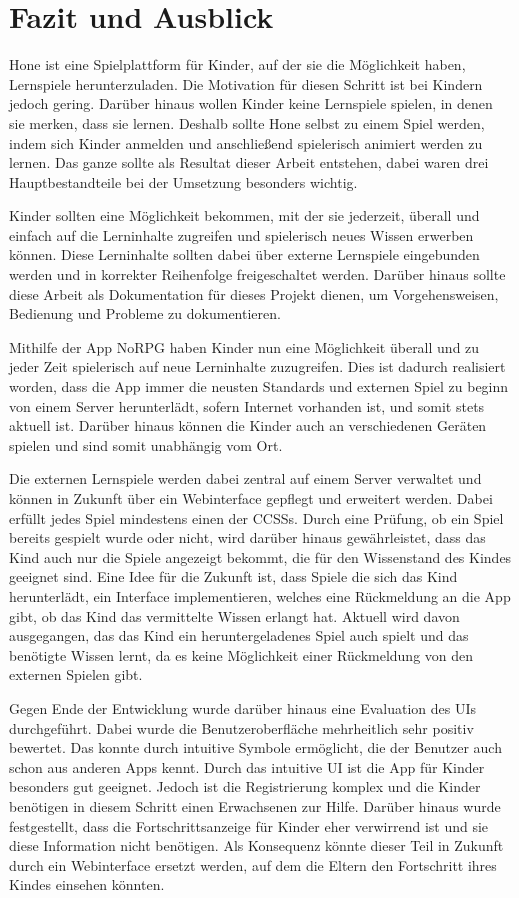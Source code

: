 \chapter{Fazit und Ausblick}

Hone ist eine Spielplattform für Kinder, auf der sie die Möglichkeit haben, Lernspiele herunterzuladen. Die Motivation für diesen Schritt ist bei Kindern jedoch gering. Darüber hinaus wollen Kinder keine Lernspiele spielen, in denen sie merken, dass sie lernen. Deshalb sollte Hone selbst zu einem Spiel werden, indem sich Kinder anmelden und anschließend spielerisch animiert werden zu lernen. Das ganze sollte als Resultat dieser Arbeit entstehen, dabei waren drei Hauptbestandteile bei der Umsetzung besonders wichtig. 

Kinder sollten eine Möglichkeit bekommen, mit der sie jederzeit, überall und einfach auf die Lerninhalte zugreifen und spielerisch neues Wissen erwerben können. Diese Lerninhalte sollten dabei über externe Lernspiele eingebunden werden und in korrekter Reihenfolge freigeschaltet werden. Darüber hinaus sollte diese Arbeit als Dokumentation für dieses Projekt dienen, um Vorgehensweisen, Bedienung und Probleme zu dokumentieren. 

Mithilfe der App NoRPG haben Kinder nun eine Möglichkeit überall und zu jeder Zeit spielerisch auf neue Lerninhalte zuzugreifen. Dies ist dadurch realisiert worden, dass die App immer die neusten Standards und externen Spiel zu beginn von einem Server herunterlädt, sofern Internet vorhanden ist, und somit stets aktuell ist. Darüber hinaus können die Kinder auch an verschiedenen Geräten spielen und sind somit unabhängig vom Ort. 

Die externen Lernspiele werden dabei zentral auf einem Server verwaltet und können in Zukunft über ein Webinterface gepflegt und erweitert werden. Dabei erfüllt jedes Spiel mindestens einen der \acp{CCSS}. Durch eine Prüfung, ob ein Spiel bereits gespielt wurde oder nicht, wird darüber hinaus gewährleistet, dass das Kind auch nur die Spiele angezeigt bekommt, die für den Wissenstand des Kindes geeignet sind. Eine Idee für die Zukunft ist, dass Spiele die sich das Kind herunterlädt, ein Interface implementieren, welches eine Rückmeldung an die App gibt, ob das Kind das vermittelte Wissen erlangt hat. Aktuell wird davon ausgegangen, das das Kind ein heruntergeladenes Spiel auch spielt und das benötigte Wissen lernt, da es keine Möglichkeit einer Rückmeldung von den externen Spielen gibt.

Gegen Ende der Entwicklung wurde darüber hinaus eine Evaluation des \aclp{UI} durchgeführt. Dabei wurde die Benutzeroberfläche mehrheitlich sehr positiv bewertet. Das konnte durch intuitive Symbole ermöglicht, die der Benutzer auch schon aus anderen Apps kennt. Durch das intuitive \ac{UI} ist die App für Kinder besonders gut geeignet. Jedoch ist die Registrierung komplex und die Kinder benötigen in diesem Schritt einen Erwachsenen zur Hilfe. Darüber hinaus wurde festgestellt, dass die Fortschrittsanzeige für Kinder eher verwirrend ist und sie diese Information nicht benötigen. Als Konsequenz könnte dieser Teil in Zukunft durch ein Webinterface ersetzt werden, auf dem die Eltern den Fortschritt ihres Kindes einsehen könnten. 
	
